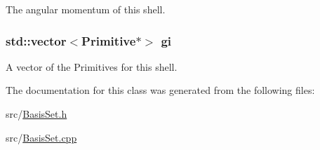 The angular momentum of this shell. \hypertarget{classJKBuilder_1_1Shell_afd0049f3a997082e636f4dae72879da2}{
\subsubsection[{gi}]{\setlength{\rightskip}{0pt plus 5cm}std::vector$<${\bf Primitive}$\ast$$>$ {\bf gi}}}
\label{classJKBuilder_1_1Shell_afd0049f3a997082e636f4dae72879da2}


A vector of the Primitives for this shell. 

The documentation for this class was generated from the following files:\begin{DoxyCompactItemize}
\item 
src/\hyperlink{BasisSet_8h}{BasisSet.h}\item 
src/\hyperlink{BasisSet_8cpp}{BasisSet.cpp}\end{DoxyCompactItemize}
